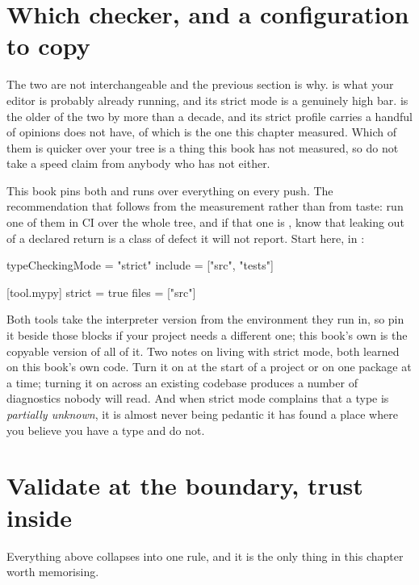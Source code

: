 \section{Which checker, and a configuration to copy}
\label{sec:ch03-config}

The two are not interchangeable and the previous section is why. 
is what your editor is probably already running, and its strict mode is a
genuinely high bar.  is the older of the two by more than a decade,
and its strict profile carries a handful of opinions  does not
have, of which  is the one this chapter measured. Which
of them is quicker over your tree is a thing this book has not measured, so
do not take a speed claim from anybody who has not either.

This book pins both and runs  over everything on every push. The
recommendation that follows from the measurement rather than from taste: run
one of them in CI over the whole tree, and if that one is , know
that  leaking out of a declared return is a class of defect it will
not report. Start here, in :

\begin{tomlcode}
typeCheckingMode = "strict"
include = ["src", "tests"]

[tool.mypy]
strict = true
files = ["src"]
\end{tomlcode}

\noindent
Both tools take the interpreter version from the environment they run in, so
pin it beside those blocks if your project needs a different one; this book's
own  is the copyable version of all of it. Two
notes on living with strict mode, both learned on this book's own code.
Turn it on at the start of a project or on one package at a time; turning it
on across an existing codebase produces a number of diagnostics nobody will
read. And when strict mode complains that a type is \emph{partially unknown},
it is almost never being pedantic \dash{} it has found a place where you
believe you have a type and do not.

\section{Validate at the boundary, trust inside}
\label{sec:ch03-boundary}

Everything above collapses into one rule, and it is the only thing in this
chapter worth memorising.

